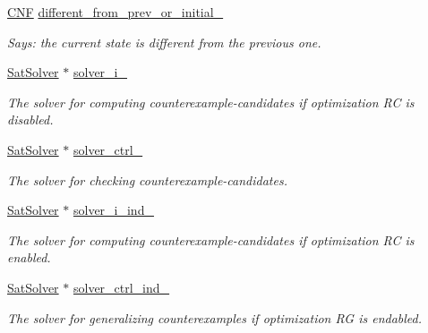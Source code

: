 \begin{DoxyCompactItemize}
\hyperlink{classCNF}{C\-N\-F} \hyperlink{classLearnSynthSAT_a1b0ed51f21b9fbb8cc0954e011968389}{different\-\_\-from\-\_\-prev\-\_\-or\-\_\-initial\-\_\-}
\begin{DoxyCompactList}\small\item\em Says\-: the current state is different from the previous one. \end{DoxyCompactList}\item 
\hyperlink{classSatSolver}{Sat\-Solver} $\ast$ \hyperlink{classLearnSynthSAT_a97e5c03d47cb7f237104472972b12c1c}{solver\-\_\-i\-\_\-}
\begin{DoxyCompactList}\small\item\em The solver for computing counterexample-\/candidates if optimization R\-C is disabled. \end{DoxyCompactList}\item 
\hyperlink{classSatSolver}{Sat\-Solver} $\ast$ \hyperlink{classLearnSynthSAT_abb28d64291205442f1df055049ef0195}{solver\-\_\-ctrl\-\_\-}
\begin{DoxyCompactList}\small\item\em The solver for checking counterexample-\/candidates. \end{DoxyCompactList}\item 
\hyperlink{classSatSolver}{Sat\-Solver} $\ast$ \hyperlink{classLearnSynthSAT_ae7f4a4e3546f46ad1256e203311226cf}{solver\-\_\-i\-\_\-ind\-\_\-}
\begin{DoxyCompactList}\small\item\em The solver for computing counterexample-\/candidates if optimization R\-C is enabled. \end{DoxyCompactList}\item 
\hyperlink{classSatSolver}{Sat\-Solver} $\ast$ \hyperlink{classLearnSynthSAT_ab81d5f53e078238feb1e948a5a5366ff}{solver\-\_\-ctrl\-\_\-ind\-\_\-}
\begin{DoxyCompactList}\small\item\em The solver for generalizing counterexamples if optimization R\-G is endabled. \end{DoxyCompactList}\end{DoxyCompactItemize}
